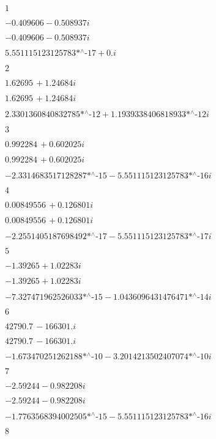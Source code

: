 \noindent\(1\)

\noindent\(-0.409606-0.508937 i\)

\noindent\(-0.409606-0.508937 i\)

\noindent\(\text{5.551115123125783$\grave{ }$*${}^{\wedge}$-17}+0. i\)

\noindent\(2\)

\noindent\(1.62695\, +1.24684 i\)

\noindent\(1.62695\, +1.24684 i\)

\noindent\(\text{2.3301360840832785$\grave{ }$*${}^{\wedge}$-12}+\text{1.1939338406818933$\grave{ }$*${}^{\wedge}$-12} i\)

\noindent\(3\)

\noindent\(0.992284\, +0.602025 i\)

\noindent\(0.992284\, +0.602025 i\)

\noindent\(-\text{2.3314683517128287$\grave{ }$*${}^{\wedge}$-15}-\text{5.551115123125783$\grave{ }$*${}^{\wedge}$-16} i\)

\noindent\(4\)

\noindent\(0.00849556\, +0.126801 i\)

\noindent\(0.00849556\, +0.126801 i\)

\noindent\(-\text{2.2551405187698492$\grave{ }$*${}^{\wedge}$-17}-\text{5.551115123125783$\grave{ }$*${}^{\wedge}$-17} i\)

\noindent\(5\)

\noindent\(-1.39265+1.02283 i\)

\noindent\(-1.39265+1.02283 i\)

\noindent\(-\text{7.327471962526033$\grave{ }$*${}^{\wedge}$-15}-\text{1.0436096431476471$\grave{ }$*${}^{\wedge}$-14} i\)

\noindent\(6\)

\noindent\(42790.7\, -166301. i\)

\noindent\(42790.7\, -166301. i\)

\noindent\(-\text{1.673470251262188$\grave{ }$*${}^{\wedge}$-10}-\text{3.2014213502407074$\grave{ }$*${}^{\wedge}$-10} i\)

\noindent\(7\)

\noindent\(-2.59244-0.982208 i\)

\noindent\(-2.59244-0.982208 i\)

\noindent\(-\text{1.7763568394002505$\grave{ }$*${}^{\wedge}$-15}-\text{5.551115123125783$\grave{ }$*${}^{\wedge}$-16} i\)

\noindent\(8\)

